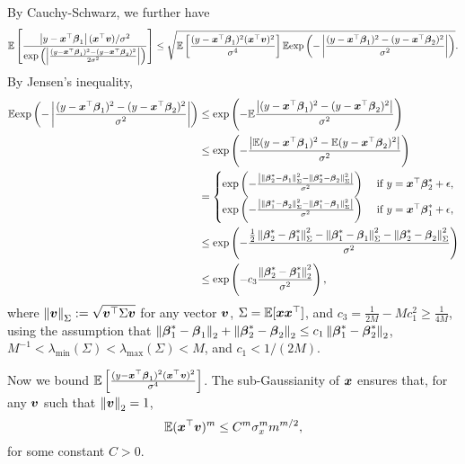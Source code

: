By Cauchy-Schwarz, we further have
\begin{equation}
	\label{eq:E-partial-oemga-2}
	\EE\brackets{\frac{\abs{y-\bx^{\top}\bbeta_1}(\bx^{\top}\bv)/\sigma^2}{\exp\paren{\abs{\frac{(y-\bx^{\top}\bbeta_1)^2-(y-\bx^{\top}\bbeta_2)^2}{2\sigma^2}}}}} \leq \sqrt{\EE\brackets{\frac{(y-\bx^{\top}\bbeta_1)^2(\bx^{\top}\bv)^2}{\sigma^4}}\EE{\exp\paren{-\abs{\frac{(y-\bx^{\top}\bbeta_1)^2-(y-\bx^{\top}\bbeta_2)^2}{\sigma^2}}}}}.
\end{equation}
By Jensen's inequality, 
\begin{align*}
	\EE{\exp\paren{-\abs{\frac{(y-\bx^{\top}\bbeta_1)^2-(y-\bx^{\top}\bbeta_2)^2}{\sigma^2}}}} &\leq \exp\paren{-\EE\frac{\abs{(y-\bx^{\top}\bbeta_1)^2-(y-\bx^{\top}\bbeta_2)^2}}{\sigma^2}}\\ &\leq \exp\paren{-\frac{\abs{\EE(y-\bx^{\top}\bbeta_1)^2-\EE(y-\bx^{\top}\bbeta_2)^2}}{\sigma^2}}\\
	&=\begin{cases}
		\exp\paren{-\frac{\abs{\norm{\bbeta_2^*-\bbeta_1}^2_{\Sigma}-\norm{\bbeta_2^*-\bbeta_2}^2_{\Sigma}}}{\sigma^2}} & \text{ if } y=\bx^{\top}\bbeta_2^*+\epsilon, \\
		\exp\paren{-\frac{\abs{\norm{\bbeta_1^*-\bbeta_2}^2_{\Sigma}-\norm{\bbeta_1^*-\bbeta_1}^2_{\Sigma}}}{\sigma^2}} & \text{ if } y=\bx^{\top}\bbeta_1^*+\epsilon,
	\end{cases}\\
	&\leq \exp\paren{-\frac{\frac{1}{2}\norm{\bbeta_2^*-\bbeta^*_1}^2_{\Sigma}-\norm{\bbeta_1^*-\bbeta_1}^2_{\Sigma}-\norm{\bbeta_2^*-\bbeta_2}^2_{\Sigma}}{\sigma^2}}\\
	&\leq \exp\paren{-c_3\frac{\norm{\bbeta_2^*-\bbeta^*_1}^2_{2}}{\sigma^2}},
\end{align*}
where $\norm{\bv}_{\Sigma} := \sqrt{\bv^{\top}\Sigma\bv}$ for any vector $\bv$, $\Sigma = \EE [\bx\bx^{\top}]$, and $c_3=\frac{1}{2M}-Mc_1^2 \geq \frac{1}{4M}$, using the assumption that $\norm{\bbeta_1^*-\bbeta_1}_{2}+\norm{\bbeta_2^*-\bbeta_2}_{2} \leq c_1 \norm{\bbeta_1^*-\bbeta_2^*}_2$,  $M^{-1}<\lambda_{\min}(\Sigma)<\lambda_{\max}(\Sigma)<M$, and $c_1<1/(2M)$.

Now we bound $\EE\brackets{\frac{(y-\bx^{\top}\bbeta_1)^2(\bx^{\top}\bv)^2}{\sigma^4}}$. The sub-Gaussianity of $\bx$ ensures that, for any $\bv$ such that $\norm{\bv}_2=1$,  \[\EE(\bx^{\top}\bv)^m \leq C^{m}\sigma_{x}^mm^{m/2},\] for some constant $C >0$.


